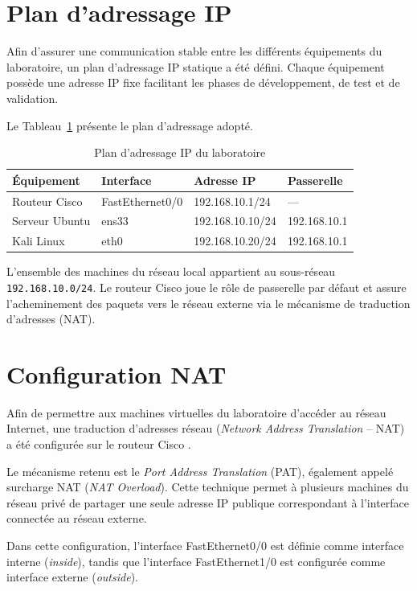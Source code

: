 \section{Plan d'adressage IP}

Afin d'assurer une communication stable entre les différents équipements du laboratoire, un plan d'adressage IP statique a été défini. Chaque équipement possède une adresse IP fixe facilitant les phases de développement, de test et de validation.

Le Tableau~\ref{tab:ip-addressing} présente le plan d'adressage adopté.

\begin{table}[htbp]
\centering
\caption{Plan d'adressage IP du laboratoire}
\label{tab:ip-addressing}

\begin{tabular}{llll}
\toprule
Équipement & Interface & Adresse IP & Passerelle \\
\midrule
Routeur Cisco & FastEthernet0/0 & 192.168.10.1/24 & --- \\
Serveur Ubuntu & ens33 & 192.168.10.10/24 & 192.168.10.1 \\
Kali Linux & eth0 & 192.168.10.20/24 & 192.168.10.1 \\
\bottomrule
\end{tabular}

\end{table}

L'ensemble des machines du réseau local appartient au sous-réseau \texttt{192.168.10.0/24}. Le routeur Cisco joue le rôle de passerelle par défaut et assure l'acheminement des paquets vers le réseau externe via le mécanisme de traduction d'adresses (NAT).

\section{Configuration NAT}

Afin de permettre aux machines virtuelles du laboratoire d'accéder au réseau Internet, une traduction d'adresses réseau (\textit{Network Address Translation} -- NAT) a été configurée sur le routeur Cisco \cite{cisco_ios}.

Le mécanisme retenu est le \textit{Port Address Translation} (PAT), également appelé surcharge NAT (\textit{NAT Overload}). Cette technique permet à plusieurs machines du réseau privé de partager une seule adresse IP publique correspondant à l'interface connectée au réseau externe.

Dans cette configuration, l'interface FastEthernet0/0 est définie comme interface interne (\textit{inside}), tandis que l'interface FastEthernet1/0 est configurée comme interface externe (\textit{outside}).

